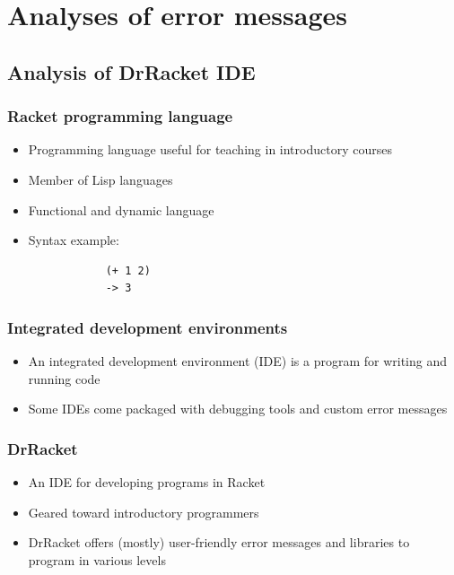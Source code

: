\documentclass{beamer}
\begin{document}
\section[Analyses]{Analyses of error messages}

\subsection[DrRacket Analysis]{Analysis of DrRacket IDE}

\begin{frame}[fragile]
	\frametitle{Racket programming language}
		\begin{itemize}
			\item Programming language useful for teaching in introductory courses
			\item Member of Lisp languages
			\item Functional and dynamic language
			\item Syntax example:
			\begin{verbatim}
			(+ 1 2)
			-> 3
			\end{verbatim}
		\end{itemize}

\end{frame}

\begin{frame}
	\frametitle{Integrated development environments}
		\begin{itemize}
			\item An integrated development environment (IDE) is a program for writing and running code
			\item Some IDEs come packaged with debugging tools and custom error messages
		\end{itemize}

\end{frame}

\begin{frame}[fragile]
	\frametitle{DrRacket}
		\begin{itemize}
			\item An IDE for developing programs in Racket
			\item Geared toward introductory programmers
			\item DrRacket offers (mostly) user-friendly error messages and libraries to program in various levels
		\end{itemize}
		
\end{frame}
\end{document}
